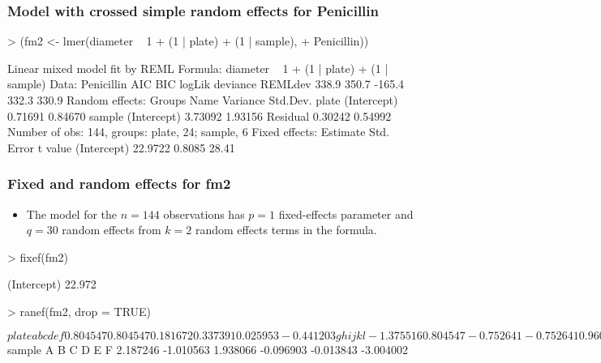 \begin{frame}[fragile]
  \frametitle{Model with crossed simple random effects for Penicillin}
\begin{Schunk}
\begin{Sinput}
> (fm2 <- lmer(diameter ~ 1 + (1 | plate) + (1 | sample), 
+     Penicillin))
\end{Sinput}
\begin{Soutput}
Linear mixed model fit by REML 
Formula: diameter ~ 1 + (1 | plate) + (1 | sample) 
   Data: Penicillin 
   AIC   BIC logLik deviance REMLdev
 338.9 350.7 -165.4    332.3   330.9
Random effects:
 Groups   Name        Variance Std.Dev.
 plate    (Intercept) 0.71691  0.84670 
 sample   (Intercept) 3.73092  1.93156 
 Residual             0.30242  0.54992 
Number of obs: 144, groups: plate, 24; sample, 6
Fixed effects:
            Estimate Std. Error t value
(Intercept)  22.9722     0.8085   28.41
\end{Soutput}
\end{Schunk}
\end{frame}


\begin{frame}[fragile]
  \frametitle{Fixed and random effects for fm2}
  \begin{itemize}
  \item The model for the $n=144$ observations has $p=1$ fixed-effects
    parameter and $q=30$ random effects from $k=2$ random effects
    terms in the formula.
  \end{itemize}
\begin{Schunk}
\begin{Sinput}
> fixef(fm2)
\end{Sinput}
\begin{Soutput}
(Intercept) 
     22.972 
\end{Soutput}
\begin{Sinput}
> ranef(fm2, drop = TRUE)
\end{Sinput}
\begin{Soutput}
$plate
        a         b         c         d         e         f 
 0.804547  0.804547  0.181672  0.337391  0.025953 -0.441203 
        g         h         i         j         k         l 
-1.375516  0.804547 -0.752641 -0.752641  0.960266  0.493109 
        m         n         o         p         q         r 
 1.427422  0.493109  0.960266  0.025953 -0.285484 -0.285484 
        s         t         u         v         w         x 
-1.375516  0.960266 -0.908360 -0.285484 -0.596922 -1.219797 
$sample
        A         B         C         D         E         F 
 2.187246 -1.010563  1.938066 -0.096903 -0.013843 -3.004002 
\end{Soutput}
\end{Schunk}
\end{frame}


